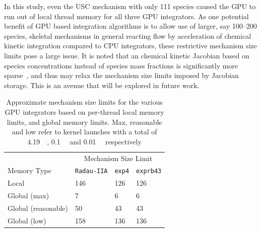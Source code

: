\documentclass[preprint,12pt]{elsarticle}
\begin{document}
In this study, even the USC mechanism with only 111 species caused the GPU to run out of local thread memory for all three GPU integrators.
As one potential benefit of GPU based integration algorithms is to allow use of larger, say 100--200 species, skeletal mechanisms in general reacting flow by acceleration of chemical kinetic integration compared to CPU integrators, these restrictive mechanism size limits pose a large issue.
It is noted that an chemical kinetic Jacobian based on species concentrations instead of species mass fractions is significantly more sparse~\cite{Lu:2009gh}, and thus may relax the mechanism size limits imposed by Jacobian storage.
This is an avenue that will be explored in future work.

\begin{table}[tbp]
\centering
\begin{tabular}{@{}l l l l@{}}
 \toprule
& \multicolumn{3}{c}{Mechanism Size Limit} \\
Memory Type & \texttt{Radau-IIA} & \texttt{exp4} & \texttt{exprb43} \\
\midrule
Local	    & 146 & 126 & 126 \\

Global (max)	    & 7 & 6 & 6 \\
Global (reasonable) & 50 & 43 & 43 \\
Global (low) & 158 & 136 & 136 \\
\bottomrule
\end{tabular}
\caption{
Approximate mechanism size limits for the various GPU integrators based on per-thread local memory limits, and global memory limits.
Max, reasonable and low refer to kernel launches with a total of \SI{4.19}{\mega\threads}, \SI{0.1}{\mega\threads} and \SI{0.01}{\mega\threads} respectively
}
\label{T:size_limits}
\end{table}

\pagebreak



\end{document}
